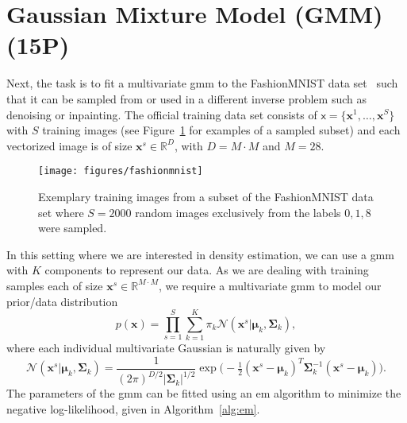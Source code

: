 \documentclass{article}
\newcommand{\R}{\mathbb{R}}
\renewcommand{\vec}[1]{\textbf{#1}}
\renewcommand{\vec}[1]{\textbf{#1}}
\begin{document}
\section{Gaussian Mixture Model (GMM) (15P)}
Next, the task is to fit a multivariate \gls{gmm} to the FashionMNIST data set~\cite{xiao2017fashionmnist} such that it can be sampled from or used in a different inverse problem such as denoising or inpainting. The official training data set consists of $\boldsymbol{\mathsf{x}} = \{\vec x^1, \dots, \vec x^S \}$ with $S$ training images (see Figure~\ref{fig:mnist} for examples of a sampled subset) and each vectorized image is of size $\vec x^s \in \R^{D}$, with $D=M\cdot M$ and $M=28$. 

\begin{figure}[H]
\begin{center}
\texttt{[image: figures/fashionmnist]} \caption{Exemplary training images from a subset of the FashionMNIST data set where $S=2000$ random images exclusively from the labels $0,1,8$ were sampled.} \label{fig:mnist}
\end{center}
\end{figure}

In this setting where we are interested in density estimation, we can use a \gls{gmm} with $K$ components to represent our data. As we are dealing with training samples each of size $\vec x ^s \in \R^{M\cdot M}$, we require a multivariate \gls{gmm} to model our prior/data distribution
\begin{equation}
p(\vec x) = \prod_{s=1}^S \sum_{k=1}^K \pi_k \mathcal{N}(\vec x^s|\boldsymbol{\mu}_k, \boldsymbol{\Sigma}_k), 
\end{equation}
where each individual multivariate Gaussian is naturally given by
\[
\mathcal{N}(\vec x^s|\boldsymbol{\mu}_k, \boldsymbol{\Sigma}_k) = \frac{1}{(2\pi)^{D/2} |\boldsymbol{\Sigma}_k|^{1/2} } \exp\big (-\tfrac 1 2 (\vec x^s - \boldsymbol{\mu}_k)^T \boldsymbol{\Sigma}_k^{-1} (\vec x^s - \boldsymbol{\mu}_k)\big).
\]
The parameters of the \gls{gmm} can be fitted using an \gls{em} algorithm to minimize the negative log-likelihood, given in Algorithm~\ref{alg:em}.
\end{document}
